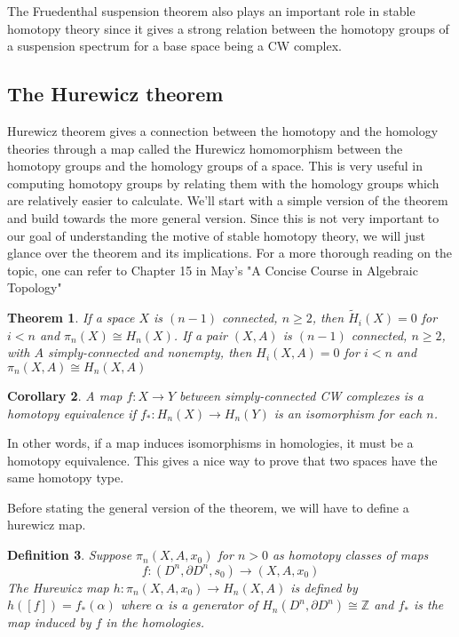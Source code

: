 \documentclass[12pt]{extarticle}
\newcounter{pic}[page]
\numberwithin{equation}{section}
\newtheorem{thm}{Theorem}[section]
\newtheorem{cor}[thm]{Corollary}
\newtheorem{defn}[thm]{Definition}
\newcommand{\Z}{\mathbb{Z}}
\begin{document}
The Fruedenthal suspension theorem also plays an important role in stable homotopy theory since it gives a strong relation between the homotopy groups of a suspension spectrum for a base space being a CW complex.

\subsection{The Hurewicz theorem}
Hurewicz theorem gives a connection between the homotopy and the homology theories through a map called the Hurewicz homomorphism between the homotopy groups and the homology groups of a space. This is very useful in computing homotopy groups by relating them with the homology groups which are relatively easier to calculate. We'll start with a simple version of the theorem and build towards the more general version. Since this is not very important to our goal of understanding the motive of stable homotopy theory, we will just glance over the theorem and its implications. For a more thorough reading on the topic, one can refer to Chapter 15 in May's "A Concise Course in Algebraic Topology" \cite[p.~117]{May:1416976}\\


\begin{thm}\cite[p.~366]{Hatcher}
If a space $X$ is $(n-1)$ connected, $n \geq 2$, then $\widetilde{H}_i(X)=0$ for $i < n$
and $\pi_n(X) \cong H_n(X)$. If a pair $(X,A)$ is $(n-1)$ connected, $n \geq 2$, with $A$ simply-connected and nonempty, then $H_i(X,A) = 0$ for $i < n$ and $\pi_n(X,A) \cong H_n(X,A)$
\end{thm}

\begin{cor}
A map $f :X\to Y$ between simply-connected CW complexes is a homotopy equivalence if $f_* :H_n(X)\to H_n(Y)$ is an isomorphism for each $n$.
\end{cor}

In other words, if a map induces isomorphisms in homologies, it must be a homotopy equivalence. This gives a nice way to prove that two spaces have the same homotopy type.


Before stating the general version of the theorem, we will have to define a hurewicz map.\\

\begin{defn}
Suppose $\pi_n(X,A,x_0)$ for $n > 0$ as homotopy classes of maps
$$f :(D^n,\partial D^n,s_0)\to (X,A,x_0)$$
The Hurewicz map $h:\pi_n(X,A,x_0)\to H_n(X,A)$ is defined by $h([f]) = f_*(\alpha)$ where $\alpha$ is a generator of $H_n(D^n,\partial D^n) \cong \Z$ and $f_*$ is the map induced by $f$ in the homologies.
\end{defn}
\end{document}
